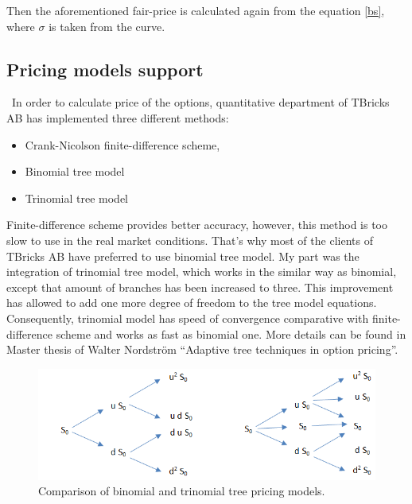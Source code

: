 \documentclass[]{article}
\begin{document}
Then the aforementioned fair-price is calculated again from the equation \ref{bs}, where $\sigma$ is taken from the curve.

\subsection*{Pricing models support} \
In order to calculate price of the options, quantitative department of TBricks AB has implemented three different methods:
\begin{itemize}
	\item Crank-Nicolson finite-difference scheme,
	\item Binomial tree model
	\item Trinomial tree model
\end{itemize}
Finite-difference scheme provides better accuracy, however, this method is too slow to use in the real market conditions. That's why most of the clients of TBricks AB have preferred to use binomial tree model.
My part was the integration of trinomial tree model, which works in the similar way as binomial, except that amount of branches has been increased to three. This improvement has allowed to add one more degree of freedom to the tree model equations. Consequently, trinomial model has speed of convergence comparative with finite-difference scheme and works as fast as binomial one. More details can be found in Master thesis of Walter Nordström ``Adaptive tree techniques in option pricing''.
\begin{figure}
	\includegraphics[scale=0.5]{bm}
	\caption{Comparison of binomial and trinomial tree pricing models.}
\end{figure}
\end{document}
